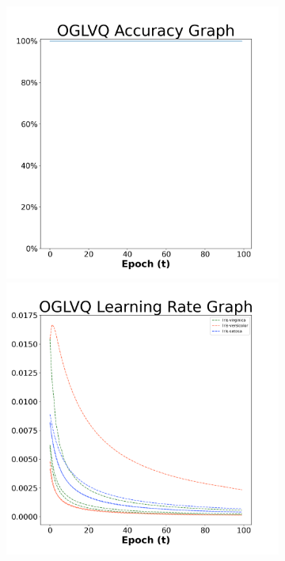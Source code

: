 \begin{figure}[H]
    \centering %
\begin{subfigure}{0.3\textwidth}
  \includegraphics[width=\linewidth]{images/exper1/iris/OGLVQ_0.01_acc.png}
    \includegraphics[width=\linewidth]{images/exper1/iris/OGLVQ_0.01_lr.png}

\end{subfigure}
\end{figure}
